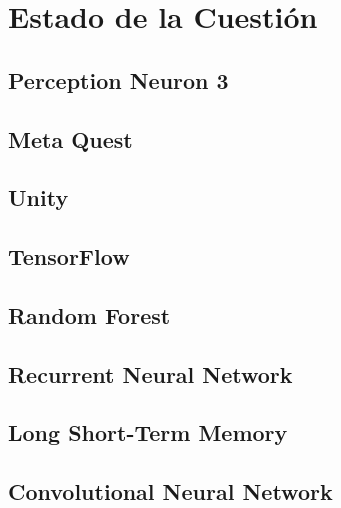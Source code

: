 \chapter{Estado de la Cuestión}
\label{cap:estadoDeLaCuestion}

\cite{GBBSP23}

\section{Perception Neuron 3}
\section{Meta Quest}
\section{Unity}
\section{TensorFlow}
\section{Random Forest}
\section{Recurrent Neural Network}
\section{Long Short-Term Memory}
\section{Convolutional Neural Network}

